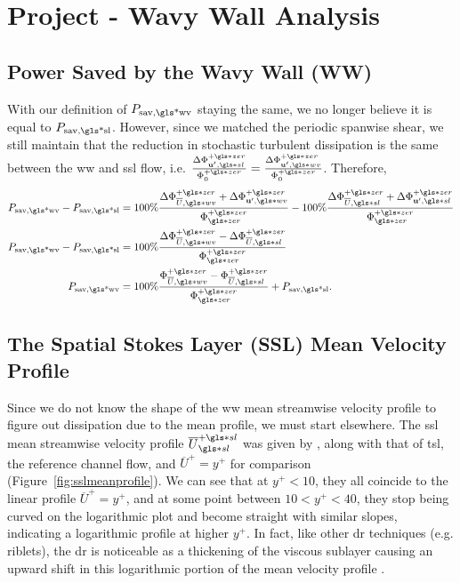 \chapter{Project - Wavy Wall Analysis}\glsresetall
\section{Power Saved by the Wavy Wall (WW)}
With our definition of $P_\text{sav,\gls*{wv}}$ staying the same, we no longer believe it is equal to $P_\text{sav,\gls*{sl}}$. However, since we matched the periodic spanwise shear, we still maintain that the reduction in stochastic turbulent dissipation is the same between the \gls{ww} and \gls{ssl} flow, i.e. $\frac{\Delta \Phi _{\mathbf{u} ',\gls*{sl}}\pz}{\Phi _{0}\pz}=\frac{\Delta \Phi _{\mathbf{u} ',\gls*{wv}}\pz}{\Phi _{0}\pz}$. Therefore,
\begin{align}
	P_\text{sav,\gls*{wv}}	-P_\text{sav,\gls*{sl}} &= 100\%\frac{\Delta \Phi _{\overline{U },\gls*{wv}}\pz+\Delta \Phi _{\mathbf{u} ',\gls*{wv}}\pz}{\Phi \zz\pz}-100\% \frac{\Delta \Phi _{\overline{U },\gls*{sl}}\pz+\Delta \Phi _{\mathbf{u} ',\gls*{sl}}\pz}{\Phi \zz\pz}\\
	P_\text{sav,\gls*{wv}}	-P_\text{sav,\gls*{sl}}  &= 100\% \frac{\Delta \Phi _{\overline{U },\gls*{wv}}\pz-\Delta \Phi _{\overline{U },\gls*{sl}}\pz}{\Phi \zz\pz}\\
	P_\text{sav,\gls*{wv}} &= 100\% \frac{ \Phi _{\overline{U },\gls*{wv}}\pz-\Phi _{\overline{U },\gls*{sl}}\pz}{\Phi \zz\pz}+P_\text{sav,\gls*{sl}}
.\end{align}


\section{The Spatial Stokes Layer (SSL) Mean Velocity Profile}\label{sec:sslmean}
Since we do not know the shape of the \gls{ww} mean streamwise velocity profile to figure out dissipation due to the mean profile, we must start elsewhere. The \gls{ssl} mean streamwise velocity profile $\overline{U}\ssl\ps$ was given by \vqt, along with that of \gls{tsl}, the reference channel flow, and $\overline{U}^{+}=y^{+}$ for comparison (Figure~\ref{fig:sslmeanprofile}). We can see that at $y^{+}<10$, they all coincide to the linear profile $\overline{U}^{+}=y^{+}$, and at some point between $10<y^{+}<40$, they stop being curved on the logarithmic plot and become straight with similar slopes, indicating a logarithmic profile at higher $y^{+}$. In fact, like other \gls{dr} techniques (e.g. riblets), the \gls{dr} is noticeable as a thickening of the viscous sublayer causing an upward shift in this logarithmic portion of the mean velocity profile \cite{viotti2009,choi1989,luchini1996}. 

